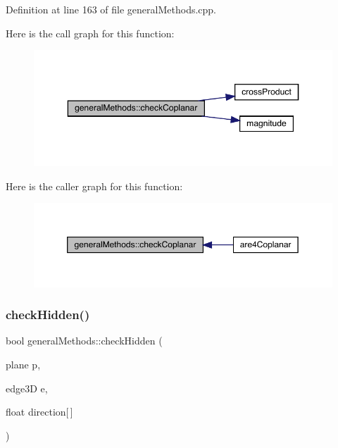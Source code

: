 Definition at line 163 of file general\+Methods.\+cpp.

Here is the call graph for this function\+:
\nopagebreak
\begin{figure}[H]
\begin{center}
\leavevmode
\includegraphics[width=350pt]{namespacegeneral_methods_a508d15a0c76920dc4f98cf8da254f9c4_cgraph}
\end{center}
\end{figure}
Here is the caller graph for this function\+:
\nopagebreak
\begin{figure}[H]
\begin{center}
\leavevmode
\includegraphics[width=350pt]{namespacegeneral_methods_a508d15a0c76920dc4f98cf8da254f9c4_icgraph}
\end{center}
\end{figure}
\mbox{\label{namespacegeneral_methods_ab4e1b4b0a8b5b7697adddbb27950e639}} 
\subsubsection{\texorpdfstring{check\+Hidden()}{checkHidden()}}
{\footnotesize\ttfamily bool general\+Methods\+::check\+Hidden (\begin{DoxyParamCaption}\item[{plane}]{p,  }\item[{edge3D}]{e,  }\item[{float}]{direction\mbox{[}$\,$\mbox{]} }\end{DoxyParamCaption})}




